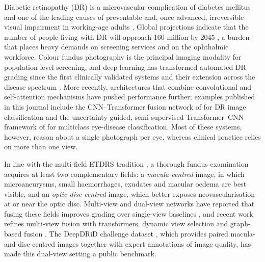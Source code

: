 \documentclass[final,5p,times,twocolumn,authoryear]{elsarticle}
\theoremstyle{plain}
\theoremstyle{remark}
\begin{document}
Diabetic retinopathy (DR) is a microvascular complication of diabetes mellitus and one of the leading causes of preventable and, once advanced, irreversible visual impairment in working-age adults \citep{Cheung2010}. Global projections indicate that the number of people living with DR will approach 160 million by 2045 \citep{Teo2021}, a burden that places heavy demands on screening services and on the ophthalmic workforce. Colour fundus photography is the principal imaging modality for population-level screening, and deep learning has transformed automated DR grading since the first clinically validated systems \citep{Gulshan2016,Ting2017} and their extension across the disease spectrum \citep{Dai2021}. More recently, architectures that combine convolutional and self-attention mechanisms have pushed performance further; examples published in this journal include the CNN--Transformer fusion network of \citet{Huang2025drctfn} for DR image classification and the uncertainty-guided, semi-supervised Transformer--CNN framework of \citet{Malik2026uncertainty} for multiclass eye-disease classification. Most of these systems, however, reason about a single photograph per eye, whereas clinical practice relies on more than one view.

In line with the multi-field ETDRS tradition \citep{ETDRS1991report10}, a thorough fundus examination acquires at least two complementary fields: a \emph{macula-centred} image, in which microaneurysms, small haemorrhages, exudates and macular oedema are best visible, and an \emph{optic-disc-centred} image, which better exposes neovascularisation at or near the optic disc. Multi-view and dual-view networks have reported that fusing these fields improves grading over single-view baselines \citep{Zhao2019multiview,Sun2021dualview,Wang2021mvdr}, and recent work refines multi-view fusion with transformers, dynamic view selection and graph-based fusion \citep{Luo2025dynsel,Li2026mvgfdr}. The DeepDRiD challenge dataset \citep{Liu2022deepdrid}, which provides paired macula- and disc-centred images together with expert annotations of image quality, has made this dual-view setting a public benchmark.
\end{document}
